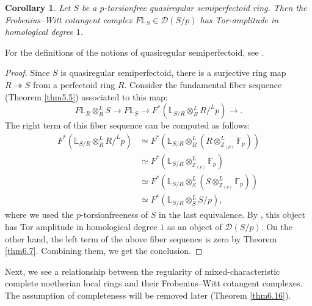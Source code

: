 \documentclass[11pt, a4paper]{amsart}
\theoremstyle{plain}
\newtheorem{coro}[theorem]{Corollary}
\theoremstyle{definition}
\begin{document}

\begin{coro}\label{cor6.9}
    Let $S$ be a $p$-torsionfree quasiregular semiperfectoid ring. Then the Frobenius--Witt cotangent complex $F\mathbb L_S\in \mathcal D(S/p)$ has  Tor-amplitude in homological degree $1$.
\end{coro}
For the definitions of the notions of quasiregular semiperfectoid, see \cite[Definition 4.20]{BMS19}.
\begin{proof}
    Since $S$ is quasiregular semiperfectoid, there is a surjective ring map $R\twoheadrightarrow S$ from a perfectoid ring $R$. Consider the fundamental fiber sequence (Theorem \ref{thm5.5}) associated to this map:\[F\mathbb L_R\otimes_R^LS\to F\mathbb L_S\to F^*(\mathbb L_{S/R}\otimes_R^LR/^Lp)\to .\] The right term of this fiber sequence can be computed as follows:\begin{align*}
        F^*(\mathbb L_{S/R}\otimes_R^LR/^Lp)&\simeq F^*(\mathbb L_{S/R}\otimes_R^L(R\otimes^L_{\mathbb Z_{(p)}}\mathbb F_p))\\
        &\simeq F^*(\mathbb L_{S/R}\otimes^L_{\mathbb Z_{(p)}}\mathbb F_p)\\
        &\simeq F^*(\mathbb L_{S/R}\otimes_S^L(S\otimes^L_{\mathbb Z_{(p)}}\mathbb F_p))\\
        &\simeq F^*(\mathbb L_{S/R}\otimes_S^LS/p),
    \end{align*} where we used the $p$-torsionfreeness of $S$ in the last equivalence. By \cite[Lemma 4.25]{BMS19}, this object has Tor amplitude in homological degree $1$ as an object of $\mathcal D(S/p)$. On the other hand, the left term of the above fiber sequence is zero by Theorem \ref{thm6.7}. Combining them, we get the conclusion.
\end{proof}

Next, we see a relationship between the regularity of mixed-characteristic complete noetherian local rings and their Frobenius--Witt cotangent complexes. The assumption of completeness will be removed later (Theorem \ref{thm6.16}).
\end{document}
